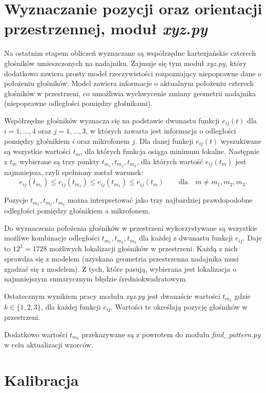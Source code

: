  
\section{Wyznaczanie pozycji oraz orientacji przestrzennej, moduł \textit{xyz.py}}

Na ostatnim etapem obliczeń wyznaczane są współrzędne kartezjańskie czterech głośników umieszczonych na nadajniku.
Zajmuje się tym moduł \textit{xyz.py}, który dodatkowo zawiera prosty model rzeczywistości
rozpoznający niepoprawne dane o położeniu głośników.
Model zawiera informacje o aktualnym położeniu czterech głośników w przestrzeni, co umożliwia wychwycenie 
zmiany geometrii nadajnika (niepoprawne odległości pomiędzy głośnikami).

Współrzędne głośników wyznacza się na podstawie dwunastu funkcji $e_{ij}(t)$ dla $i=1, ..., 4$ oraz $j=1, ..., 3$,
w których zawarta jest informacja o odległości pomiędzy głośnikiem $i$ oraz mikrofonem $j$.
Dla danej funkcji $e_{ij}(t)$ wyszukiwane są wszystkie wartości $t_m$, dla których funkcja osiąga minimum lokalne.
Następnie z $t_m$ wybierane są trzy punkty $t_{m_1}, t_{m_2}, t_{m_3}$, dla których wartość $e_{ij}(t_m)$ jest najmniejsza,
czyli spełniony został warunek:
\[ e_{ij}(t_{m_1}) \leq e_{ij}(t_{m_2}) \leq e_{ij}(t_{m_3}) \leq e_{ij}(t_m) \qquad \text{dla} \quad m \ne m_1,m_2,m_3. \]

Pozycje $t_{m_1}, t_{m_2}, t_{m_3}$  można interpretować jako trzy najbardziej prawdopodobne odległości 
pomiędzy głośnikiem a mikrofonem.

Do wyznaczenia położenia głośników w przestrzeni wykorzystywane są wszystkie możliwe kombinacje 
odległości $t_{m_1}, t_{m_2}, t_{m_3}$ dla każdej z dwunastu funkcji $e_{ij}$.
Daje to $12^3 = 1728$ możliwych lokalizacji głośników w przestrzeni. 
Każdą z nich sprawdza się z modelem (uzyskana geometria przestrzenna nadajnika musi zgadzać się z
modelem). Z tych, które pasują, wybierana jest lokalizacja o najmniejszym sumarycznym błędzie średniokwadratowym.

Ostatecznym wynikiem pracy modułu \textit{xyz.py} jest dwanaście wartości $t_{m_k}$ gdzie $k \in \{1,2,3\}$, 
dla każdej funkcji $e_{ij}$. Wartości te określają pozycję głośników w przestrzeni.

Dodatkowo wartości $t_{m_k}$ przekazywane są z powrotem do modułu \textit{find\_pattern.py} w celu aktualizacji wzorców.


\section{Kalibracja}

